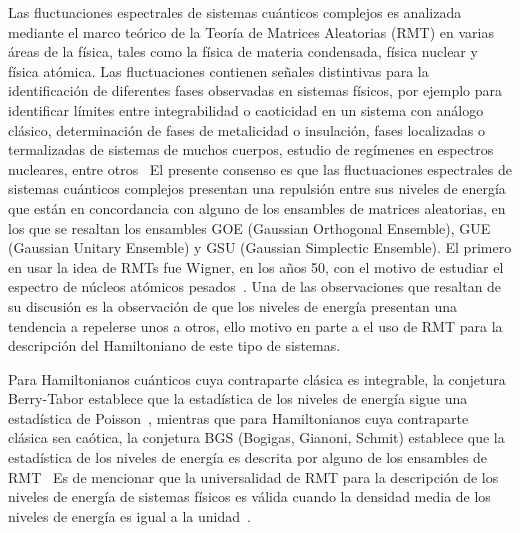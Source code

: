 \documentclass[spanish,titlepage,table]{practicas}
\begin{document}
Las fluctuaciones espectrales de sistemas cuánticos complejos es analizada mediante 
el marco teórico de la Teoría de Matrices Aleatorias (RMT) en varias áreas de la física, 
tales como la física de materia condensada, física nuclear y física atómica.
Las fluctuaciones contienen señales distintivas para la identificación de diferentes fases observadas 
en sistemas físicos, por ejemplo para identificar límites entre integrabilidad o caoticidad en un sistema con análogo clásico,
determinación de fases de metalicidad o insulación, fases localizadas o termalizadas de sistemas de muchos cuerpos, estudio de regímenes en espectros nucleares, entre otros~\cite{Tekur2020}
El presente consenso es que las fluctuaciones espectrales de sistemas cuánticos complejos presentan 
una repulsión entre sus niveles de energía que están en concordancia con alguno de los ensambles de matrices 
aleatorias, en los que se resaltan los ensambles GOE (Gaussian Orthogonal Ensemble), GUE (Gaussian Unitary Ensemble) y GSU (Gaussian Simplectic Ensemble).
El primero en usar la idea de RMTs fue Wigner, en los años 50, con el motivo de estudiar el espectro de núcleos atómicos pesados~\cite{Wigner1955}.
Una de las observaciones que resaltan de su discusión es la observación de que los niveles de energía presentan una tendencia a repelerse unos a otros, 
ello motivo en parte a el uso de RMT para la descripción del Hamiltoniano de este tipo de sistemas. 

Para Hamiltonianos cuánticos cuya contraparte clásica es integrable, la conjetura Berry-Tabor establece que 
la estadística de los niveles de energía sigue una estadística de Poisson~\cite{BerryTabor1977}, mientras que para Hamiltonianos 
cuya contraparte clásica sea caótica, la conjetura BGS (Bogigas, Gianoni, Schmit) establece que la estadística de los niveles de energía es descrita 
por alguno de los ensambles de RMT~\cite{Atas_2013}
Es de mencionar que la universalidad de RMT para la descripción de los niveles de energía de sistemas físicos 
es válida cuando la densidad media de los niveles de energía es igual a la unidad~\cite{Atas_2013}.
\end{document}
